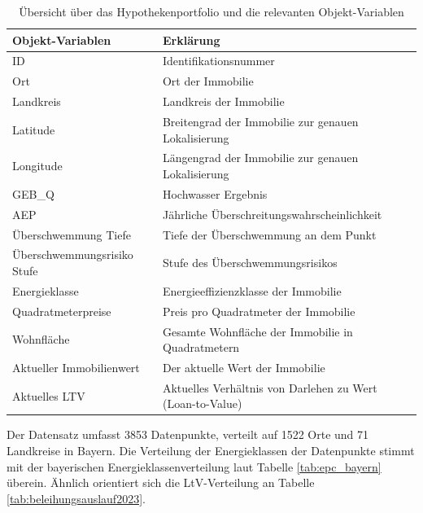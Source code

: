 \begin{table}[htbp]
    \centering
    \small
    \caption{Übersicht über das Hypothekenportfolio und die relevanten Objekt-Variablen}
    \label{tab:objekt-variablen}
    \begin{tabularx}{1.0\textwidth}{>{\raggedright\arraybackslash}X >{\raggedright\arraybackslash}X}
        \toprule
        \textbf{Objekt-Variablen} & \textbf{Erklärung} \\
        \midrule
        ID & Identifikationsnummer \\
        \addlinespace
        Ort & Ort der Immobilie \\
        \addlinespace
        Landkreis & Landkreis der Immobilie \\
        \addlinespace
        Latitude & Breitengrad der Immobilie zur genauen Lokalisierung \\
        \addlinespace
        Longitude & Längengrad der Immobilie zur genauen Lokalisierung \\
        \addlinespace
        GEB\_Q & Hochwasser Ergebnis \\
        \addlinespace
        AEP & Jährliche Überschreitungswahrscheinlichkeit \\
        \addlinespace
        Überschwemmung Tiefe & Tiefe der Überschwemmung an dem Punkt \\
        \addlinespace
        Überschwemmungsrisiko Stufe & Stufe des Überschwemmungsrisikos \\
        \addlinespace
        Energieklasse & Energieeffizienzklasse der Immobilie \\
        \addlinespace
        Quadratmeterpreise & Preis pro Quadratmeter der Immobilie \\
        \addlinespace
        Wohnfläche & Gesamte Wohnfläche der Immobilie in Quadratmetern \\
        \addlinespace
        Aktueller Immobilienwert & Der aktuelle Wert der Immobilie \\
        \addlinespace        Aktuelles LTV & Aktuelles Verhältnis von Darlehen zu Wert (Loan-to-Value) \\
        \bottomrule
    \end{tabularx}
\end{table}
\FloatBarrier
Der Datensatz umfasst 3853 Datenpunkte, verteilt auf 1522 Orte und 71 Landkreise in Bayern. Die Verteilung der Energieklassen der Datenpunkte stimmt mit der bayerischen Energieklassenverteilung laut Tabelle \ref{tab:epc_bayern} überein. Ähnlich orientiert sich die LtV-Verteilung an Tabelle \ref{tab:beleihungsauslauf2023}.
